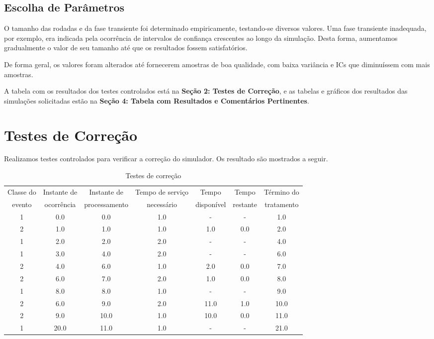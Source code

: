 \documentclass[a4paper,12pt]{report}
\begin{document}
\section{Escolha de Parâmetros}
O tamanho das rodadas e da fase transiente foi determinado empiricamente, testando-se diversos valores. Uma fase transiente inadequada, por exemplo, era indicada pela ocorrência de intervalos de confiança crescentes ao longo da simulação. Desta forma, aumentamos gradualmente o valor de seu tamanho até que os resultados fossem satisfatórios.

De forma geral, os valores foram alterados até fornecerem amostras de boa qualidade, com baixa variância e ICs que diminuíssem com mais amostras.

A tabela com os resultados dos testes controlados está na \textbf{Seção 2: Testes de Correção}, e as tabelas e gráficos dos resultados das simulações solicitadas estão na \textbf{Seção 4: Tabela com Resultados e Comentários Pertinentes}.

\chapter{Testes de Correção}
Realizamos testes controlados para verificar a correção do simulador. Os resultado são mostrados a seguir.

\begin{table}[htbp]
  \begin{tabular}{|c|c|c|c|c|c|c|}
    \hline
    \footnotesize Classe do & \footnotesize Instante de & \footnotesize Instante de       & \footnotesize Tempo de serviço & \footnotesize Tempo      & \footnotesize Tempo   & \footnotesize Término do \\
    \footnotesize evento     & \footnotesize ocorrência  & \footnotesize processamento & \footnotesize necessário           & \footnotesize disponível & \footnotesize restante & \footnotesize tratamento \\ \hline
    1 & 0.0  & 0.0   & 1.0 & -     & -    & 1.0 \\ \hline
    2 & 1.0  & 1.0   & 1.0 & 1.0  & 0.0 & 2.0 \\ \hline
    1 & 2.0  & 2.0   & 2.0 & -      & -    & 4.0 \\ \hline
    1 & 3.0  & 4.0   & 2.0 & -      & -    & 6.0 \\ \hline
    2 & 4.0  & 6.0   & 1.0 & 2.0   & 0.0 & 7.0 \\ \hline
    2 & 6.0  & 7.0   & 2.0 & 1.0   & 0.0 & 8.0 \\ \hline
    1 & 8.0  & 8.0   & 1.0 & -      & -    & 9.0 \\ \hline
    2 & 6.0  & 9.0   & 2.0 & 11.0 & 1.0 & 10.0 \\ \hline
    2 & 9.0  & 10.0 & 1.0 & 10.0 & 0.0 & 11.0 \\ \hline
    1 & 20.0 & 11.0 & 1.0 & -     & -    & 21.0 \\ \hline
  \end{tabular}
\caption{Testes de correção}
\end{table}
\end{document}

